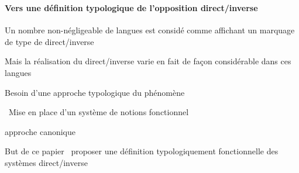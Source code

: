 \begin{frame}
\frametitle{}
\framesubtitle{Vers une définition typologique de l'opposition direct/inverse}
\begin{wideitemize}
\item Un nombre non-négligeable de langues est considé comme affichant un marquage de
  type de direct/inverse
\item Mais la réalisation du direct/inverse varie en fait de façon
  considérable dans ces langues\\ 
\item[\highlighti{\lefthand}] Besoin d'une approche typologique du phénomène
\end{wideitemize}
\begin{wideitemize}
\item[\highlightiv{\lefthand}]~Mise en place d'un système de notions fonctionnel
\item[\highlightiv{\lefthand}] approche canonique
\end{wideitemize}
\begin{wideitemize}
\item[\highlightii{\lefthand}] But de ce papier \lefthand ~proposer une définition typologiquement
  fonctionnelle des systèmes direct/inverse
\end{wideitemize}
\end{frame}
